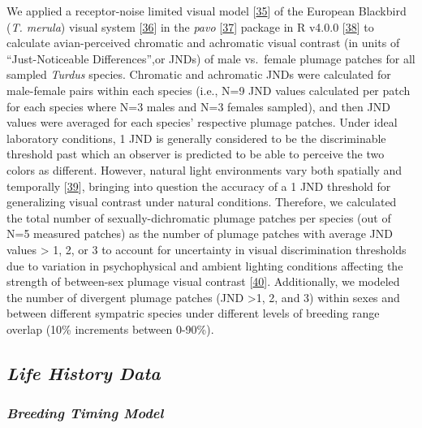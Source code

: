 \documentclass[
  a4paper,
]{article}
\begin{document}
We applied a receptor-noise limited visual model
{[}\protect\hyperlink{ref-vorobyev1998}{35}{]} of the European Blackbird
(\emph{T. merula}) visual system
{[}\protect\hyperlink{ref-hart2000}{36}{]} in the \emph{pavo}
{[}\protect\hyperlink{ref-maia2019}{37}{]}⁠ package in R v4.0.0
{[}\protect\hyperlink{ref-rcoreteam2020}{38}{]}⁠ to calculate
avian-perceived chromatic and achromatic visual contrast (in units of
``Just-Noticeable Differences'',or JNDs) of male vs.~female plumage
patches for all sampled \emph{Turdus} species. Chromatic and achromatic
JNDs were calculated for male-female pairs within each species (i.e.,
N=9 JND values calculated per patch for each species where N=3 males and
N=3 females sampled), and then JND values were averaged for each
species' respective plumage patches. Under ideal laboratory conditions,
1 JND is generally considered to be the discriminable threshold past
which an observer is predicted to be able to perceive the two colors as
different. However, natural light environments vary both spatially and
temporally {[}\protect\hyperlink{ref-endler1993}{39}{]}⁠, bringing into
question the accuracy of a 1 JND threshold for generalizing visual
contrast under natural conditions. Therefore, we calculated the total
number of sexually-dichromatic plumage patches per species (out of N=5
measured patches) as the number of plumage patches with average JND
values \textgreater{} 1, 2, or 3 to account for uncertainty in visual
discrimination thresholds due to variation in psychophysical and ambient
lighting conditions affecting the strength of between-sex plumage visual
contrast {[}\protect\hyperlink{ref-kemp2015}{40}{]}⁠. Additionally, we
modeled the number of divergent plumage patches (JND \textgreater1, 2,
and 3) within sexes and between different sympatric species under
different levels of breeding range overlap (10\% increments between
0-90\%).

\hypertarget{life-history-data}{%
\subsection{\texorpdfstring{\emph{Life History
Data}}{Life History Data}}\label{life-history-data}}

\hypertarget{breeding-timing-model}{%
\subsubsection{\texorpdfstring{\emph{Breeding Timing
Model}}{Breeding Timing Model}}\label{breeding-timing-model}}
\end{document}
